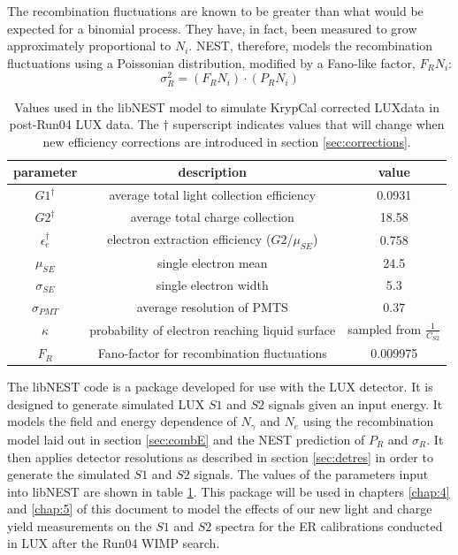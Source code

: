 The recombination fluctuations are known to be greater than what would be expected for a binomial process. They have, in fact, been measured to grow approximately proportional to $N_i$\cite{attila}. NEST, therefore, models the recombination fluctuations using a Poissonian distribution, modified by a Fano-like factor, $F_RN_i$\cite{Evanyields}:
\begin{equation}
\sigma_R^2=(F_RN_i)\cdot (P_RN_i)
\end{equation}
\begin{table}[h!]
\centering
    \begin{tabular}{ c | c | c  }
    \hline
    parameter & description & value \\
    \hline \hline
    $G1^{\dagger}$ & average total light collection efficiency & 0.0931\\
    \hline
    $G2^{\dagger}$ & average total charge collection & 18.58\\
    \hline
    $\epsilon_e^{\dagger}$ & electron extraction efficiency ($G2$/$\mu_{SE}$) & 0.758\\
    \hline
    $\mu_{SE}$ & single electron mean & 24.5\\
    \hline
    $\sigma_{SE}$ & single electron width & 5.3\\
    \hline
    $\sigma_{PMT}$ & average resolution of PMTS & 0.37\\
    \hline
    $\kappa$ & probability of electron reaching liquid surface & sampled from $\frac{1}{C_{S2}}$\\
    \hline
    $F_R$ & Fano-factor for recombination fluctuations & 0.009975\\
    \hline
    \end{tabular}
    \caption{Values used in the libNEST model to simulate KrypCal corrected LUXdata in post-Run04 LUX data. The $\dagger$ superscript indicates values that will change when new efficiency corrections are introduced in section \ref{sec:corrections}.}
    \label{tab:libnestparms}
\end{table}


The libNEST code is a package developed for use with the LUX detector. It is designed to generate simulated LUX $S1$ and $S2$ signals given an input energy. It models the field and energy dependence of $N_{\gamma}$ and $N_e$ using the recombination model laid out in section \ref{sec:combE} and the NEST prediction of $P_R$ and $\sigma_R$. It then applies detector resolutions as described in section \ref{sec:detres} in order to generate the simulated $S1$ and $S2$ signals. The values of the parameters input into libNEST are shown in table \ref{tab:libnestparms}. This package will be used in chapters \ref{chap:4} and \ref{chap:5} of this document to model the effects of our new light and charge yield measurements on the $S1$ and $S2$ spectra for the ER calibrations conducted in LUX after the Run04 WIMP search.



